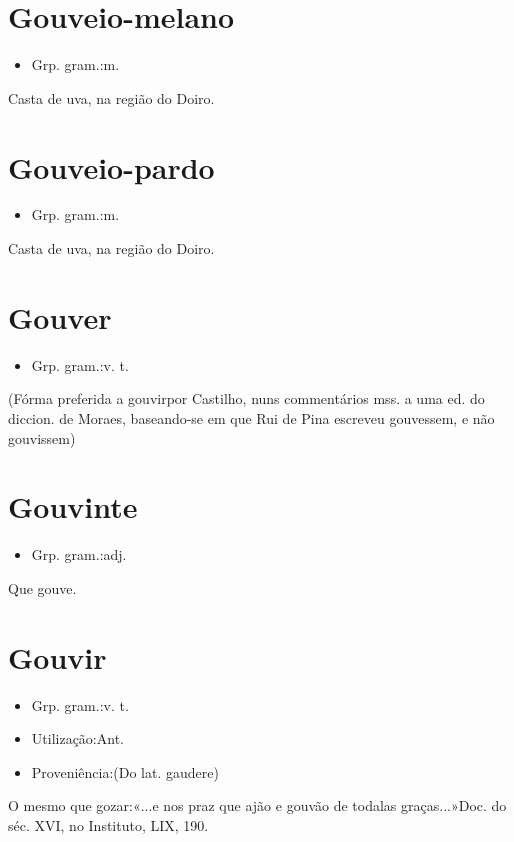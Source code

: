 \section{Gouveio-melano}
\begin{itemize}
\item {Grp. gram.:m.}
\end{itemize}
Casta de uva, na região do Doiro.
\section{Gouveio-pardo}
\begin{itemize}
\item {Grp. gram.:m.}
\end{itemize}
Casta de uva, na região do Doiro.
\section{Gouver}
\begin{itemize}
\item {Grp. gram.:v. t.}
\end{itemize}
(Fórma preferida a \textunderscore gouvir\textunderscore  por Castilho, nuns commentários mss. a uma ed. do diccion. de Moraes, baseando-se em que Rui de Pina escreveu \textunderscore gouvessem\textunderscore , e não \textunderscore gouvissem\textunderscore )
\section{Gouvinte}
\begin{itemize}
\item {Grp. gram.:adj.}
\end{itemize}
Que gouve.
\section{Gouvir}
\begin{itemize}
\item {Grp. gram.:v. t.}
\end{itemize}
\begin{itemize}
\item {Utilização:Ant.}
\end{itemize}
\begin{itemize}
\item {Proveniência:(Do lat. \textunderscore gaudere\textunderscore )}
\end{itemize}
O mesmo que \textunderscore gozar\textunderscore :«\textunderscore ...e nos praz que ajão e gouvão de todalas graças...\textunderscore »Doc. do séc. XVI, no \textunderscore Instituto\textunderscore , LIX, 190.
